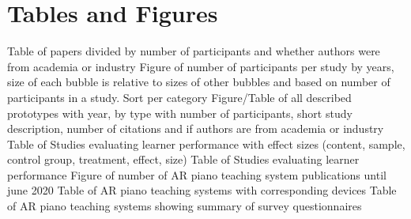 \documentclass{article}
\begin{document}
\section{Tables and Figures}
Table of papers divided by number of participants and whether authors were from academia or industry
Figure of number of participants per study by years, size of each bubble is relative to sizes of other bubbles and based on number of participants in a study. Sort per category 
Figure/Table of all described prototypes with year, by type with number of participants, short study description, number of citations and if authors are from academia or industry
Table of Studies evaluating learner performance with effect sizes (content, sample, control group, treatment, effect, size)
Table of Studies evaluating learner performance 
Figure of number of AR piano teaching system publications until june 2020
Table of AR piano teaching systems with corresponding devices 
Table of AR piano teaching systems showing summary of survey questionnaires














\end{document}
